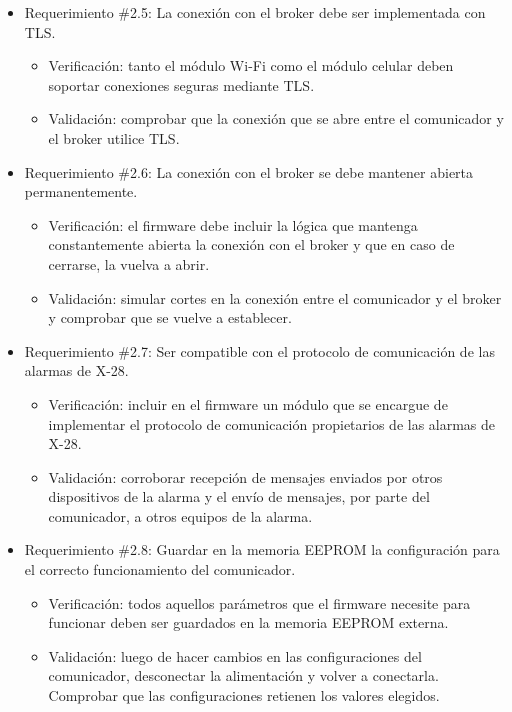 \documentclass[
11pt, %
codirector, %
]{charter}
\begin{document}
\begin{itemize}
	\item Requerimiento \#2.5: La conexión con el broker debe ser implementada con TLS.
	\begin{itemize}
		\item Verificación: tanto el módulo Wi-Fi como el módulo celular deben soportar conexiones seguras mediante TLS.
		\item Validación: comprobar que la conexión que se abre entre el comunicador y el broker utilice TLS.
	\end{itemize}
			
	\item Requerimiento \#2.6: La conexión con el broker se debe mantener abierta permanentemente.
	\begin{itemize}
		\item Verificación: el firmware debe incluir la lógica que mantenga constantemente abierta la conexión con el broker y que en caso de cerrarse, la vuelva a abrir.
		\item Validación: simular cortes en la conexión entre el comunicador y el broker y comprobar que se vuelve a establecer.
	\end{itemize}
			
	\item Requerimiento \#2.7: Ser compatible con el protocolo de comunicación de las alarmas de X-28.
	\begin{itemize}
		\item Verificación: incluir en el firmware un módulo que se encargue de implementar el protocolo de comunicación propietarios de las alarmas de X-28.
		\item Validación: corroborar recepción de mensajes enviados por otros dispositivos de la alarma y el envío de mensajes, por parte del comunicador, a otros equipos de la alarma.
	\end{itemize}
			
	\item Requerimiento \#2.8: Guardar en la memoria EEPROM la configuración para el correcto funcionamiento del comunicador.
	\begin{itemize}
		\item Verificación: todos aquellos parámetros que el firmware necesite para funcionar deben ser guardados en la memoria EEPROM externa.
		\item Validación: luego de hacer cambios en las configuraciones del comunicador, desconectar la alimentación y volver a conectarla. Comprobar que las configuraciones retienen los valores elegidos.
	\end{itemize}
			

\end{itemize}
\end{document}
